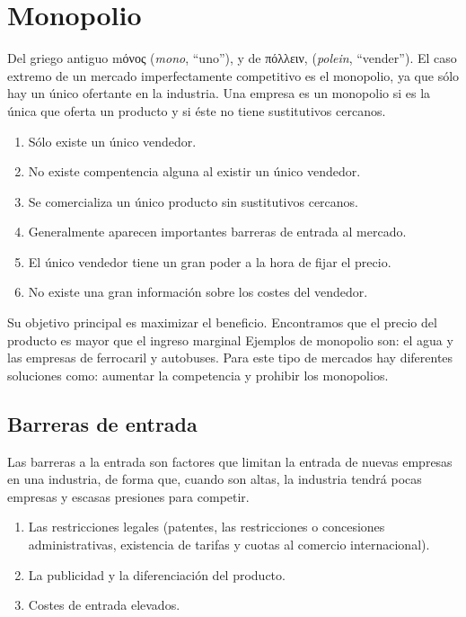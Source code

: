 \documentclass[
]{krantz}
\providecommand{\tightlist}{%
  \setlength{\itemsep}{0pt}\setlength{\parskip}{0pt}}
\begin{document}
\hypertarget{monopolio}{%
\section{Monopolio}\label{monopolio}}

Del griego antiguo mόνος (\emph{mono}, ``uno''), y de πόλλειν, (\emph{polein}, ``vender'').
El caso extremo de un mercado imperfectamente competitivo es el monopolio, ya que sólo hay un único ofertante en la industria. Una empresa es un monopolio si es la única que oferta un producto y si éste no tiene sustitutivos cercanos.

\begin{enumerate}
\def\labelenumi{\arabic{enumi}.}
\tightlist
\item
  Sólo existe un único vendedor.
\item
  No existe compentencia alguna al existir un único vendedor.
\item
  Se comercializa un único producto sin sustitutivos cercanos.
\item
  Generalmente aparecen importantes barreras de entrada al mercado.
\item
  El único vendedor tiene un gran poder a la hora de fijar el precio.
\item
  No existe una gran información sobre los costes del vendedor.
\end{enumerate}

Su objetivo principal es maximizar el beneficio. Encontramos que el precio del producto es mayor que el ingreso marginal
Ejemplos de monopolio son: el agua y las empresas de ferrocaril y autobuses.
Para este tipo de mercados hay diferentes soluciones como: aumentar la competencia y prohibir los monopolios.

\hypertarget{barreras-de-entrada}{%
\subsection{Barreras de entrada}\label{barreras-de-entrada}}

Las barreras a la entrada son factores que limitan la entrada de nuevas empresas en una industria, de forma que, cuando son altas, la industria tendrá pocas empresas y escasas presiones para competir.

\begin{enumerate}
\def\labelenumi{\arabic{enumi}.}
\tightlist
\item
  Las restricciones legales (patentes, las restricciones o concesiones administrativas, existencia de tarifas y cuotas al comercio internacional).
\item
  La publicidad y la diferenciación del producto.
\item
  Costes de entrada elevados.
\end{enumerate}
\end{document}
